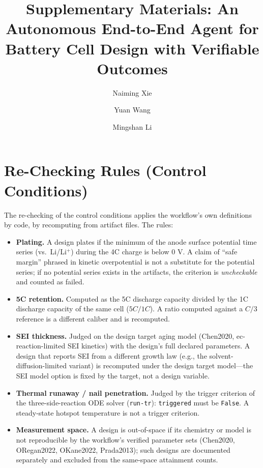 \documentclass[review,11pt]{elsarticle}
\begin{document}
\begin{frontmatter}
\title{Supplementary Materials: An Autonomous End-to-End Agent for Battery Cell Design with Verifiable Outcomes}
\author[inst1]{Naiming Xie}
\author[inst1]{Yuan Wang}
\author[inst1]{Mingshan Li}
\end{frontmatter}

\appendix

\section{Re-Checking Rules (Control Conditions)}

The re-checking of the control conditions applies the workflow's own
definitions by code, by recomputing from artifact files. The rules:

\begin{itemize}
\item \textbf{Plating.} A design plates if the minimum of the anode surface
potential time series (vs.\ Li/Li$^+$) during the 4C charge is below
$0$ V. A claim of ``safe margin'' phrased in kinetic overpotential is not a
substitute for the potential series; if no potential series exists in the
artifacts, the criterion is \emph{uncheckable} and counted as failed.
\item \textbf{5C retention.} Computed as the 5C discharge capacity divided
by the 1C discharge capacity of the same cell ($5C/1C$). A ratio computed
against a $C/3$ reference is a different caliber and is recomputed.
\item \textbf{SEI thickness.} Judged on the design target aging model (Chen2020,
ec-reaction-limited SEI kinetics) with the design's full declared parameters.
A design that reports SEI from a different growth law (e.g., the
solvent-diffusion-limited variant) is recomputed under the design target
model---the SEI model option is fixed by the target, not a design
variable.
\item \textbf{Thermal runaway / nail penetration.} Judged by the trigger
criterion of the three-side-reaction ODE solver (\texttt{run-tr}):
\texttt{triggered} must be \texttt{False}. A steady-state hotspot
temperature is not a trigger criterion.
\item \textbf{Measurement space.} A design is out-of-space if its chemistry
or model is not reproducible by the workflow's verified parameter sets
(Chen2020, ORegan2022, OKane2022, Prada2013); such designs are documented
separately and excluded from the same-space attainment counts.
\end{itemize}
\end{document}
